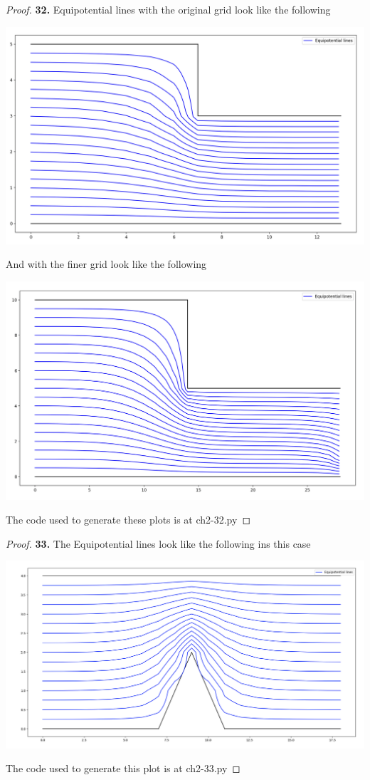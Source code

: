 \documentclass[11pt]{article}
\theoremstyle{definition}
\begin{document}
\cleardoublepage
\begin{proof}{\textbf{32.}}
    Equipotential lines with the original grid look like the following
    \begin{center}
        \includegraphics[scale=0.3]{ch2-32-1.png}
    \end{center}
    And with the finer grid look like the following
    \begin{center}
        \includegraphics[scale=0.3]{ch2-32-2.png}
    \end{center}
    The code used to generate these plots is at ch2-32.py
\end{proof}
\cleardoublepage
\begin{proof}{\textbf{33.}}
    The Equipotential lines look like the following ins this case 
    \begin{center}
        \includegraphics[scale=0.25]{ch2-33.png}
    \end{center}
    The code used to generate this plot is at ch2-33.py
\end{proof}
\end{document}
